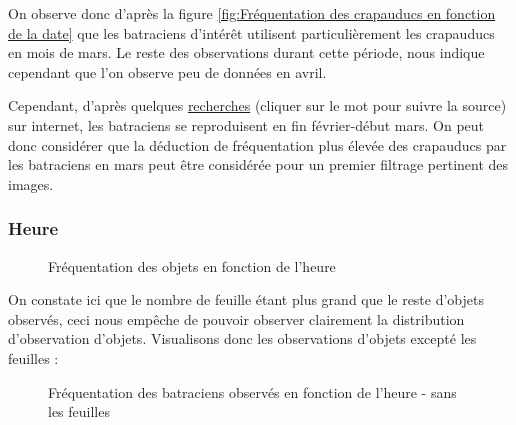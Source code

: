 \noindent On observe donc d'après la figure \ref{fig:Fréquentation des crapauducs en fonction de la date} que les batraciens d'intérêt utilisent particulièrement les crapauducs en mois de mars. Le reste des observations durant cette période, nous indique cependant que l'on observe peu de données en avril. \newline

Cependant, d'après quelques \href{http://www.karch.ch/karch/home/amphibien/osservazione-di-anfibi.html}{recherches} (cliquer sur le mot pour suivre la source) sur internet, les batraciens se reproduisent en fin février-début mars. On peut donc considérer que la déduction de fréquentation plus élevée des crapauducs par les batraciens en mars peut être considérée pour un premier filtrage pertinent des images.

\subsubsection{Heure}

\begin{figure}[H]
    \centering
    \caption{Fréquentation des objets en fonction de l'heure}
    \label{fig:Fréquentation des objets en fonction de l'heure}
\end{figure}

On constate ici que le nombre de feuille étant plus grand que le reste d'objets observés, ceci nous empêche de pouvoir observer clairement la distribution d'observation d'objets. Visualisons donc les observations d'objets excepté les feuilles :

\begin{figure}[H]
    \centering
    \caption{Fréquentation des batraciens observés en fonction de l'heure - sans les feuilles}
    \label{fig:Fréquentation des crapauducs en fonction de l'heure - sans les feuilles}
\end{figure}


